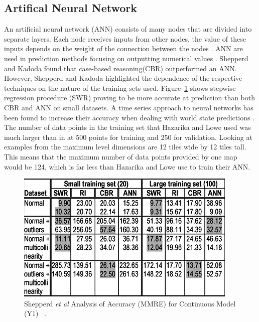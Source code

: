 \documentclass[journal]{IEEEtran}
\begin{document}
\subsection{Artifical Neural Network}
An artificial neural network (ANN) consists of many nodes that are divided into separate layers. Each node receives inputs from other nodes, the value of these inputs depends on the weight of the connection between the nodes \cite{lai2010prediction}. ANN are used in prediction methods focusing on outputting numerical values \cite{lai2010prediction, akdag2009estimation}. Shepperd and Kadoda \cite{shepperd2001comparing} found that case-based reasoning(CBR) outperformed an ANN. However, Shepperd and Kadoda\cite{shepperd2001comparing} highlighted the dependence of the respective techniques on the nature of the training sets used. Figure~\ref{learningSets} shows stepwise regression procedure (SWR) proving to be more accurate at prediction than both CBR and ANN on small datasets. A time series approach to neural networks has been found to increase their accuracy when dealing with world state predictions \cite{hazarika1998neural}. The number of data points in the training set that Hazarika and Lowe\cite{hazarika1998neural} used was much larger than in \cite{shepperd2001comparing} at 500 points for training and 250 for validation. Looking at examples from \cite{liapis2013sentient, alvarez2018fostering,  baldwin2017mixed} the maximum level dimensions are 12 tiles wide by 12 tiles tall. This means that the maximum number of data points provided by one map would be 124, which is far less than Hazarika and Lowe\cite{hazarika1998neural} use to train their ANN.

\begin{figure}[h]
	\includegraphics[width=1.0\linewidth]{trainingSets.PNG}
	\caption{Shepperd \textit{et al} Analysis of Accuracy (MMRE) for Continuous Model (Y1) ~\cite{shepperd2001comparing}.}
	\label{learningSets}
\end{figure} 
\end{document}
